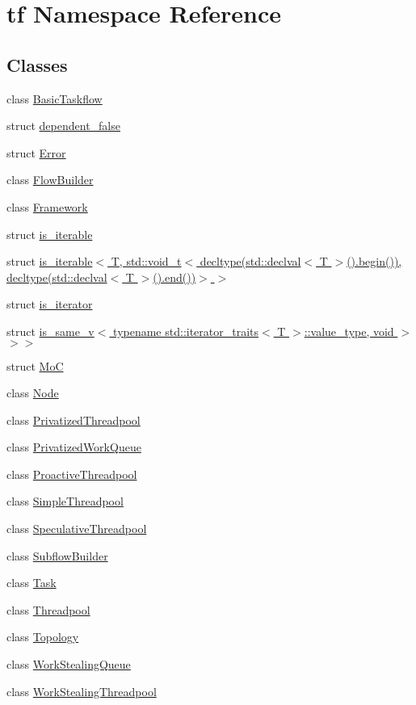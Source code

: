 \hypertarget{namespacetf}{}\section{tf Namespace Reference}
\label{namespacetf}
\subsection*{Classes}
\begin{DoxyCompactItemize}
\item 
class \hyperlink{classtf_1_1BasicTaskflow}{Basic\+Taskflow}
\item 
struct \hyperlink{structtf_1_1dependent__false}{dependent\+\_\+false}
\item 
struct \hyperlink{structtf_1_1Error}{Error}
\item 
class \hyperlink{classtf_1_1FlowBuilder}{Flow\+Builder}
\item 
class \hyperlink{classtf_1_1Framework}{Framework}
\item 
struct \hyperlink{structtf_1_1is__iterable}{is\+\_\+iterable}
\item 
struct \hyperlink{structtf_1_1is__iterable_3_01T_00_01std_1_1void__t_3_01decltype_07std_1_1declval_3_01T_01_4_07_0275ba78d7ba399cf74de163921d814a0}{is\+\_\+iterable$<$ T, std\+::void\+\_\+t$<$ decltype(std\+::declval$<$ T $>$().\+begin()), decltype(std\+::declval$<$ T $>$().\+end())$>$ $>$}
\item 
struct \hyperlink{structtf_1_1is__iterator}{is\+\_\+iterator}
\item 
struct \hyperlink{structtf_1_1is__iterator_3_01T_00_01std_1_1enable__if__t_3_9std_1_1is__same__v_3_01typename_01st0a3680c192bddd4961327b11d4422a82}{is\+\_\+same\+\_\+v$<$ typename std\+::iterator\+\_\+traits$<$ T $>$\+::value\+\_\+type, void $>$ $>$$>$}
\item 
struct \hyperlink{structtf_1_1MoC}{MoC}
\item 
class \hyperlink{classtf_1_1Node}{Node}
\item 
class \hyperlink{classtf_1_1PrivatizedThreadpool}{Privatized\+Threadpool}
\item 
class \hyperlink{classtf_1_1PrivatizedWorkQueue}{Privatized\+Work\+Queue}
\item 
class \hyperlink{classtf_1_1ProactiveThreadpool}{Proactive\+Threadpool}
\item 
class \hyperlink{classtf_1_1SimpleThreadpool}{Simple\+Threadpool}
\item 
class \hyperlink{classtf_1_1SpeculativeThreadpool}{Speculative\+Threadpool}
\item 
class \hyperlink{classtf_1_1SubflowBuilder}{Subflow\+Builder}
\item 
class \hyperlink{classtf_1_1Task}{Task}
\item 
class \hyperlink{classtf_1_1Threadpool}{Threadpool}
\item 
class \hyperlink{classtf_1_1Topology}{Topology}
\item 
class \hyperlink{classtf_1_1WorkStealingQueue}{Work\+Stealing\+Queue}
\item 
class \hyperlink{classtf_1_1WorkStealingThreadpool}{Work\+Stealing\+Threadpool}
\end{DoxyCompactItemize}
